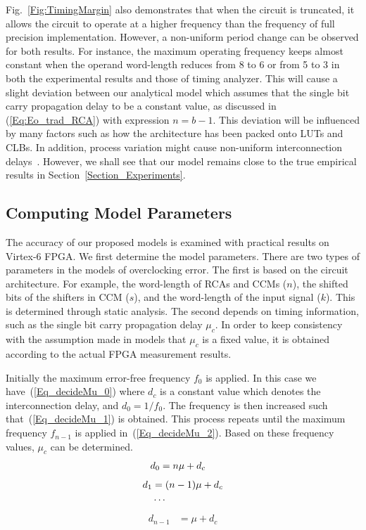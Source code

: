\documentclass[prodmode,acmtrets]{acmsmall} %
\begin{document}
Fig.~\ref{Fig:TimingMargin} also demonstrates that when the circuit is truncated, it allows the circuit to operate at a higher frequency than the frequency of full precision implementation. However, a non-uniform period change can be observed for both results. For instance, the maximum operating frequency keeps almost constant when the operand word-length reduces from 8 to 6 or from 5 to 3 in both the experimental results and those of timing analyzer. This will cause a slight deviation between our analytical model which assumes that the single bit carry propagation delay to be a constant value, as discussed in (\ref{Eq:Eo_trad_RCA}) with expression $n=b-1$. This deviation will be influenced by many factors such as how the architecture has been packed onto LUTs and CLBs. In addition, process variation might cause non-uniform interconnection delays~\cite{FPGAPV}. However, we shall see that our model remains close to the true empirical results in Section~\ref{Section_Experiments}.

\subsection{Computing Model Parameters}
The accuracy of our proposed models is examined with practical results on Virtex-6 FPGA. We first determine the model parameters. There are two types of parameters in the models of overclocking error. The first is based on the circuit architecture. For example, the word-length of RCAs and CCMs ($n$), the shifted bits of the shifters in CCM ($s$), and the word-length of the input signal ($k$). This is determined through static analysis. The second depends on timing information, such as the single bit carry propagation delay $\mu_c$. In order to keep consistency with the assumption made in models that $\mu_c$ is a fixed value, it is obtained according to the actual FPGA measurement results.

Initially the maximum error-free frequency $f_0$ is applied. In this case we have~(\ref{Eq_decideMu_0}) where $d_c$ is a constant value which denotes the interconnection delay, and $d_0=1/f_0$. The frequency is then increased such that~(\ref{Eq_decideMu_1}) is obtained. This process repeats until the maximum frequency $f_{n-1}$ is applied in~(\ref{Eq_decideMu_2}). Based on these frequency values, $\mu_c$ can be determined.
%
\begin{eqnarray}\label{Eq_decideMu_0}
  d_0 &= n\mu+d_c
  \vspace{-13ex}
\end{eqnarray}
\vspace{-4ex}
\begin{align}\label{Eq_decideMu_1}
  d_1 &= (n-1)\mu+d_c    \\
  &\cdots               \notag
  \vspace{-3ex}
\end{align}
\vspace{-4ex}
\begin{eqnarray}\label{Eq_decideMu_2}
  {d_{n-1}} &= \mu+d_c
\end{eqnarray}
\end{document}
